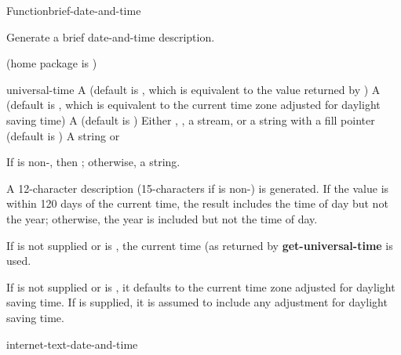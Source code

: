 \documentclass[10pt,twoside,english,pdftex]{article}
\begin{document}

\begin{functiondoc}{Function}{brief-date-and-time}{%
     
    \returns{} }
% 
% 

\fnsyntax

\fnpurpose Generate a brief date-and-time description.

\fnpackage {} (home package is )

\fnmodule {}

\fnargs
\begin{args}{universal-time}
 A  (default is \nil,
  which is equivalent to the value returned by
  )
 A  (default is \nil,
  which is equivalent to the current time zone adjusted for daylight
  saving time)
 A  (default is \nil)
\arg[destination] Either \nil, , a stream, or a string with a fill 
pointer (default is \nil)
\arg[result] A string or \nil{}
\end{args}

\fnreturns If  is non-\nil, then \nil; otherwise, a string.

\fndescription 
A 12-character description (15-characters if  is non-\nil{}) is generated.  If the  value is within 120 days
of the current time, the result  includes the time of
day but not the year; otherwise, the year is included but not the time
of day.

\W{}
%
If  is not supplied or is \nil, the current time
(as returned by \textbf{get-universal-time} is used.  

\W{}
If  is not supplied or is \nil, it defaults to the
current time zone adjusted for daylight saving time. If
 is supplied, it is assumed to include any adjustment
for daylight saving time.

\begin{alsos}{internet-text-date-and-time}
\end{alsos}


\end{functiondoc}
\end{document}
